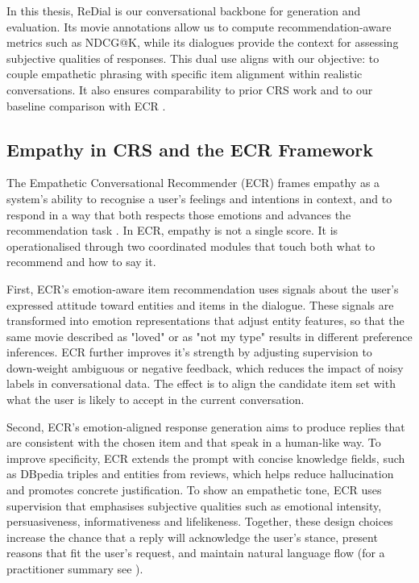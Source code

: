 \documentclass[12pt]{article}
\begin{document}
  In this thesis, ReDial is our conversational backbone for generation and evaluation. Its movie annotations allow us to compute recommendation‑aware metrics such as NDCG@K, while its dialogues provide the context for assessing subjective qualities of responses. This dual use aligns with our objective: to couple empathetic phrasing with specific item alignment within realistic conversations. It also ensures comparability to prior CRS work and to our baseline comparison with ECR \citep{zhang2024ecr}.
  
  \subsection{Empathy in CRS and the ECR Framework}
  The Empathetic Conversational Recommender (ECR) frames empathy as a system's ability to recognise a user's feelings and intentions in context, and to respond in a way that both respects those emotions and advances the recommendation task \citep{zhang2024ecr}. In ECR, empathy is not a single score. It is operationalised through two coordinated modules that touch both what to recommend and how to say it.

  First, ECR's emotion‑aware item recommendation uses signals about the user's expressed attitude toward entities and items in the dialogue. These signals are transformed into emotion representations that adjust entity features, so that the same movie described as "loved" or as "not my type" results in different preference inferences. ECR further improves it's strength by adjusting supervision to down‑weight ambiguous or negative feedback, which reduces the impact of noisy labels in conversational data. The effect is to align the candidate item set with what the user is likely to accept in the current conversation.

  Second, ECR's emotion‑aligned response generation aims to produce replies that are consistent with the chosen item and that speak in a human‑like way. To improve specificity, ECR extends the prompt with concise knowledge fields, such as DBpedia triples and entities from reviews, which helps reduce hallucination and promotes concrete justification. To show an empathetic tone, ECR uses supervision that emphasises subjective qualities such as emotional intensity, persuasiveness, informativeness and lifelikeness. Together, these design choices increase the chance that a reply will acknowledge the user's stance, present reasons that fit the user's request, and maintain natural language flow \citep{zhang2024ecr} (for a practitioner summary see \citealp{shaped_ecr_blog}).
\end{document}

